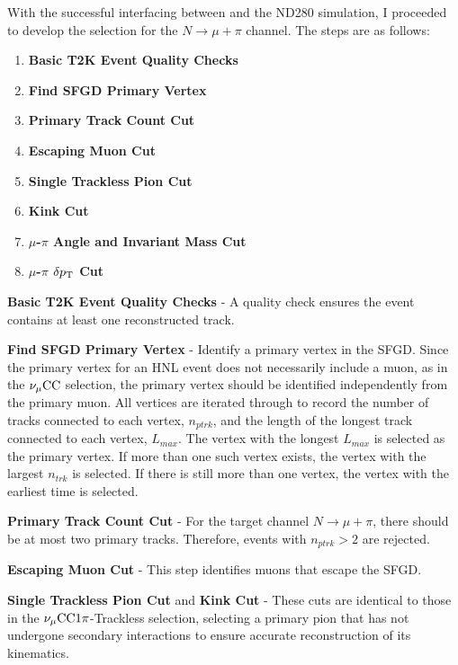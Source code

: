         With the successful interfacing between  and the ND280 simulation, I proceeded to develop the selection for the $N\rightarrow\mu+\pi$ channel. 
        The steps are as follows:
        \begin{enumerate}
            \item \textbf{Basic T2K Event Quality Checks} 
            \item \textbf{Find SFGD Primary Vertex} 
            \item \textbf{Primary Track Count Cut} 
            \item \textbf{Escaping Muon Cut} 
            \item \textbf{Single Trackless Pion Cut}
            \item \textbf{Kink Cut}
            \item \textbf{$\mu$-$\pi$ Angle and Invariant Mass Cut}
            \item \textbf{$\mu$-$\pi$ $\delta p_\textrm{T}$ Cut}
        \end{enumerate}

        \textbf{Basic T2K Event Quality Checks} - A quality check ensures the event contains at least one reconstructed track.

        \textbf{Find SFGD Primary Vertex} - Identify a primary vertex in the SFGD. 
        Since the primary vertex for an HNL event does not necessarily include a muon, as in the $\nu_{\mu}\textrm{CC}$ selection, the primary vertex should be identified independently from the primary muon. 
        All vertices are iterated through to record the number of tracks connected to each vertex, $n_{ptrk}$, and the length of the longest track connected to each vertex, $L_{max}$. 
        The vertex with the longest $L_{max}$ is selected as the primary vertex. 
        If more than one such vertex exists, the vertex with the largest $n_{trk}$ is selected. 
        If there is still more than one vertex, the vertex with the earliest time is selected.

        \textbf{Primary Track Count Cut} - For the target channel $N\rightarrow\mu+\pi$, there should be at most two primary tracks. Therefore, events with $n_{ptrk}>2$ are rejected.

        \textbf{Escaping Muon Cut} - This step identifies muons that escape the SFGD.

        \textbf{Single Trackless Pion Cut} and \textbf{Kink Cut} - These cuts are identical to those in the $\nu_{\mu}\textrm{CC}1\pi$-Trackless selection, selecting a primary pion that has not undergone secondary interactions to ensure accurate reconstruction of its kinematics.

